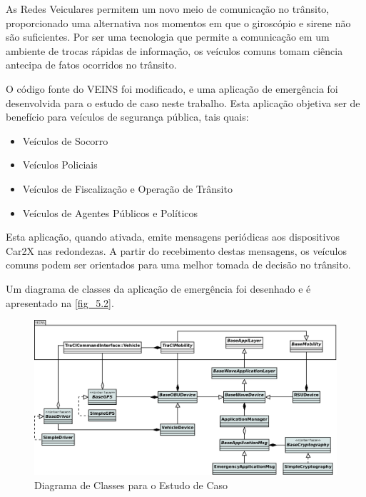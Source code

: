 \documentclass[
12pt,				%
openright,			%
oneside,			%
a4paper,			%
brazil,				%
]{abntex2}
\begin{document}
	\par As Redes Veiculares permitem um novo meio de comunicação no trânsito, proporcionado uma alternativa nos momentos em que o giroscópio e sirene não são suficientes. Por ser uma tecnologia que permite a comunicação em um ambiente de trocas rápidas de informação, os veículos comuns tomam ciência antecipa de fatos ocorridos no trânsito.
	
	\par O código fonte do VEINS foi modificado, e uma aplicação de emergência foi desenvolvida para o estudo de caso neste trabalho. Esta aplicação objetiva ser de benefício para veículos de segurança pública, tais quais:
	\begin{itemize}
		\item Veículos de Socorro
		\item Veículos Policiais
		\item Veículos de Fiscalização e Operação de Trânsito
		\item Veículos de Agentes Públicos e Políticos	
	\end{itemize}
	
	\par Esta aplicação, quando ativada, emite mensagens periódicas aos dispositivos Car2X nas redondezas. A partir do recebimento destas mensagens, os veículos comuns podem ser orientados para uma melhor tomada de decisão no trânsito.
	
	\par Um diagrama de classes da aplicação de emergência foi desenhado e é apresentado na \autoref{fig_5.2}.
	
    \begin{figure} [H]
	    \centering
	    \includegraphics[scale=.37]{figuras/cap5/52ClassesEstudodeCaso}
	    \caption{\label{fig_5.2}Diagrama de Classes para o Estudo de Caso}
    \end{figure}
\end{document}
